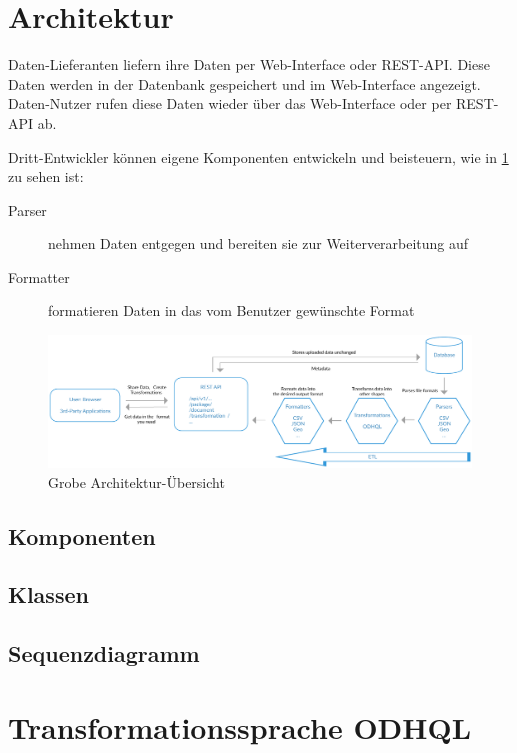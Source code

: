 \section{Architektur}
\xxx
Daten-Lieferanten liefern ihre Daten per Web-Interface oder REST-API. Diese Daten werden in der Datenbank gespeichert und im Web-Interface angezeigt. Daten-Nutzer rufen diese Daten wieder über das Web-Interface oder per REST-API ab. 

Dritt-Entwickler können eigene Komponenten entwickeln und beisteuern, wie in \cref{fig:pd:arch-overview} zu sehen ist:
\begin{description}
\item[Parser] nehmen Daten entgegen und bereiten sie zur Weiterverarbeitung auf
\item[Formatter] formatieren Daten in das vom Benutzer gewünschte Format
\end{description}

\begin{figure}[H]
    \centering
    \includegraphics[width=\linewidth]{fig/ODH-Architecture-Overview}
    \caption{Grobe Architektur-Übersicht}
    \label{fig:pd:arch-overview}
\end{figure}

\subsection{Komponenten}


\subsection{Klassen}


\subsection{Sequenzdiagramm}


\section{Transformationssprache ODHQL}

